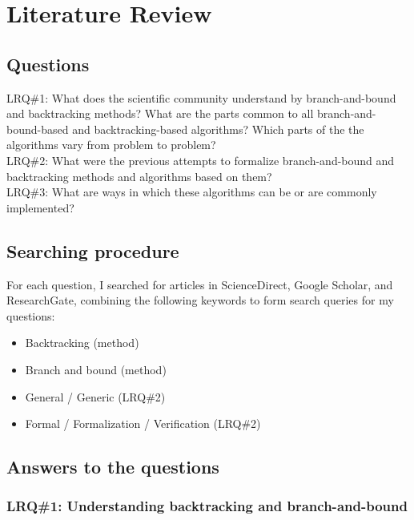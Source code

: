 \chapter{Literature Review}
\label{chap:lr}

\section{Questions}

LRQ\#1: What does the scientific community understand by branch-and-bound and backtracking methods?
What are the parts common to all branch-and-bound-based and backtracking-based algorithms?
Which parts of the the algorithms vary from problem to problem? \\

LRQ\#2: What were the previous attempts to formalize branch-and-bound and backtracking methods
and algorithms based on them? \\

LRQ\#3: What are ways in which these algorithms can be or are commonly implemented? \\

\section{Searching procedure}

For each question, I searched for articles in ScienceDirect,
Google Scholar, and ResearchGate, combining the following keywords to form search queries
for my questions:

\begin{itemize}
    \item Backtracking (method)
    \item Branch and bound (method)
    \item General / Generic (LRQ\#2)
    \item Formal / Formalization / Verification (LRQ\#2)
\end{itemize}

\section{Answers to the questions}

\subsection{LRQ\#1: Understanding backtracking and branch-and-bound}

